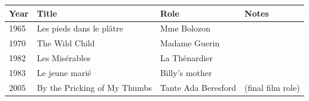 \documentclass{article}
\begin{document}
\begin{tabular}{llll}
\toprule
Year & Title & Role & Notes \\
\midrule
1965 & Les pieds dans le plâtre & Mme Bolozon &  \\
1970 & The Wild Child & Madame Guerin &  \\
1982 & Les Misérables & La Thénardier &  \\
1983 & Le jeune marié & Billy's mother &  \\
2005 & By the Pricking of My Thumbs & Tante Ada Beresford & (final film role) \\
\bottomrule
\end{tabular}
\end{document}
